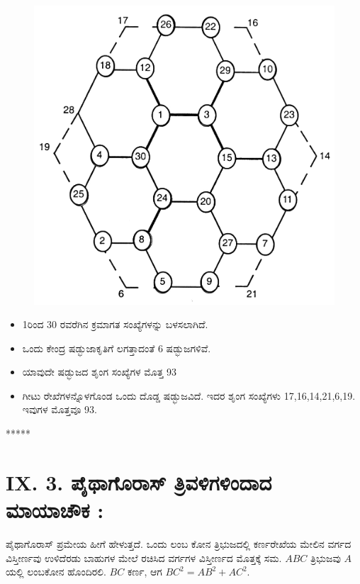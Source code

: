 \begin{figure}[H]
\includegraphics[scale=1.1]{src/figures/chap8/fig8-9.jpg}
\end{figure}
\begin{itemize}
	\item 1ರಿಂದ 30 ರವರೆಗಿನ ಕ್ರಮಾಗತ ಸಂಖ್ಯೆಗಳನ್ನು ಬಳಸಲಾಗಿದೆ.\smallskip
	\item ಒಂದು ಕೇಂದ್ರ ಷಡ್ಭುಜಾಕೃತಿಗೆ ಲಗತ್ತಾದಂತೆ 6 ಷಡ್ಭುಜಗಳಿವೆ.\smallskip
	\item ಯಾವುದೇ ಷಡ್ಭುಜದ ಶೃಂಗ ಸಂಖ್ಯೆಗಳ ಮೊತ್ತ 93\smallskip
	\item ಗೀಟು ರೇಖೆಗಳನ್ನೊಳಗೊಂಡ ಒಂದು ದೊಡ್ಡ ಷಡ್ಭುಜವಿದೆ. ಇದರ ಶೃಂಗ ಸಂಖ್ಯೆ\-ಗಳು 17,16,14,21,6,19. ಇವುಗಳ ಮೊತ್ತವೂ 93.
\end{itemize}
\begin{center}
*****
\end{center}

\section*{IX. 3. ಪೈಥಾಗೊರಾಸ್ ತ್ರಿವಳಿಗಳಿಂದಾದ ಮಾಯಾಚೌಕ :}

ಪೈಥಾಗೊರಾಸ್ ಪ್ರಮೇಯ ಹೀಗೆ ಹೇಳುತ್ತದೆ. ಒಂದು ಲಂಬ ಕೋನ ತ್ರಿಭುಜದಲ್ಲಿ ಕರ್ಣರೇಖೆಯ ಮೇಲಿನ ವರ್ಗದ ವಿಸ್ತೀರ್ಣವು ಉಳಿದೆರಡು ಬಾಹುಗಳ ಮೇಲೆ ರಚಿಸಿದ ವರ್ಗಗಳ ವಿಸ್ತೀರ್ಣದ ಮೊತ್ತಕ್ಕೆ ಸಮ. $ABC$ ತ್ರಿಭುಜವು $A$ಯಲ್ಲಿ ಲಂಬಕೋನ ಹೊಂದಿರಲಿ. $BC$ ಕರ್ಣ, ಆಗ $BC^2 = AB^2 +AC^2$. 

